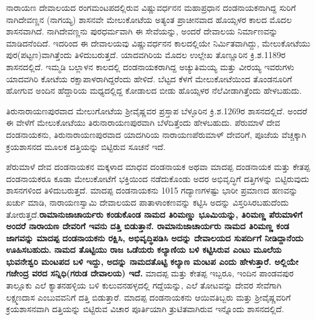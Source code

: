 \vskip 3pt

ನಾರಾಯಣ ದೇವಾಲಯದ ರಂಗಮಂಟಪದಲ್ಲಿರುವ ವಿಷ್ಣುವರ್ಧನನ ಮಹಾಪ್ರಧಾನ ದಂಡನಾಯಕನಾಗಿದ್ದ ಸುರಿಗೆ ನಾಗಿದೇವಣ್ಣನ (ನಾಗಯ್ಯ) ಶಾಸನವೇ ಮೇಲುಕೋಟೆಯ ಅತ್ಯಂತ ಪ್ರಾಚೀನವಾದ ಹೊಯ್ಸಳರ ಕಾಲದ ಮೊದಲ ಶಾಸನವಾಗಿದೆ. ನಾಗಿದೇವಣ್ಣನು ಪುರಧರ್ಮವಾಗಿ ಈ ಸೇವೆಯನ್ನು, ಅಂದರೆ ದೇವಾಲಯ ನಿರ್ಮಾಣವನ್ನು ಮಾಡಿದನೆಂದಿದೆ. ಇದರಿಂದ ಈ ದೇವಾಲಯವು ವಿಷ್ಣುವರ್ಧನನ ಕಾಲದಲ್ಲಿಯೇ ನಿರ್ಮಿತವಾಗಿದ್ದು, ಮೇಲುಕೋಟೆಯು ಪುರ(ಪಟ್ಟಣ)ವಾಗಿ\-ತ್ತೆಂದು ತಿಳಿದುಬರುತ್ತದೆ. ಯಾದವಗಿರಿಯ ಮೊದಲ ಉಲ್ಲೇಖ ತೊಣ್ಣೂರಿನ ಕ್ರಿ.ಶ.1189ರ ಶಾಸನದಲ್ಲಿದೆ. ಇಮ್ಮಡಿ ಬಲ್ಲಾಳನ ಕಾಲದಲ್ಲಿ ದಂಡನಾಯಕರಾಗಿದ್ದ ಅಚ್ಯುತಿಮಯ್ಯ ಮತ್ತು ವೀರಯ್ಯ ಇವರುಗಳು ಯಾದವಗಿರಿ ಕೋಟೆಯ ರಕ್ಷಾಪಾಳರಾಗಿದ್ದರೆಂದು ಹೇಳಿದೆ. ಬೆಟ್ಟದ ಕೆಳಗೆ ಮೇಲುಕೋಟೆಯಿಂದ ತೊಂಡನೂರಿಗೆ ಹೋಗುವ ಅಂದಿನ ಹೆದ್ದಾರಿಯ ಮಧ್ಯದಲ್ಲಿದ್ದ ಕೋಡಾಲದ ಬೀಡು ಹೊಯ್ಸಳರ ನೆಲೆವೀಡಾಗಿತ್ತೆಂದು ಹೇಳಬಹುದು.

\vskip 3pt

ತಿರುನಾರಾಯಣಪುರವಾದ ಮೇಲುಗೋಟೆಯ ಶ‍್ರೀವೈಷ್ಣವರ ಪ್ರಸ್ತಾಪ ಬೆಳ್ಳೂರಿನ ಕ್ರಿ.ಶ.1269ರ ಶಾಸನದಲ್ಲಿದೆ. ಅಂದರೆ ಈ ವೇಳೆಗೆ ಮೇಲುಕೋಟೆಯು ತಿರುನಾರಾಯಣಪುರವಾಗಿ ಬೆಳೆದಿತ್ತೆಂದು ಹೇಳಬಹುದು. ಪೆರುಮಾಳೆ ದೇವ ದಂಡನಾಯಕನು, ತಿರುನಾರಾಯಣಪುರವಾದ ಯಾದಗಿರಿಯ ನಾರಾಯಣಪೆರುಮಾಳ್​ ದೇವರಿಗೆ, ಪೂಜೆಯ ವೆಚ್ಚಕ್ಕಾಗಿ ಕ್ರಯಶಾಸನದ ಮೂಲಕ ದತ್ತಿಯನ್ನು ಬಿಟ್ಟಿರುವ ಸೂಚನೆ ಇದೆ.

\vskip 3pt

ಪೆರುಮಾಳೆ ದೇವ ದಂಡನಾಯಕನ ಮಕ್ಕಳಾದ ಮಾಧವ ದಂಡನಾಯಕ ಅಥವಾ ಮಾದಪ್ಪ ದಂಡನಾಯಕ ಮತ್ತು ಕೇತಪ್ಪ ದಂಡನಾಯಕರೂ ಕೂಡಾ ಮೇಲುಕೋಟೆಗೆ ಭಕ್ತಿಯಿಂದ ನಡೆದುಕೊಂಡು ಅದರ ಅಭಿವೃದ್ಧಿಗೆ ದತ್ತಿಗಳನ್ನು ಬಿಟ್ಟಿರುವುದು ಶಾಸನಗಳಿಂದ ತಿಳಿದುಬರುತ್ತದೆ. ಮಾದಪ್ಪ ದಂಡನಾಯಕನು 1015 ಗದ್ಯಾಣಗಳಷ್ಟು ಭಾರೀ ಪ್ರಮಾಣದ ಹಣವನ್ನು ಖರ್ಚು ಮಾಡಿ, ನಾರಾಯಣಸ್ವಾಮಿ ದೇವಾಲಯದ ಪಾತಾಳಾಂಕಣವನ್ನು ಕಟ್ಟಿಸಿ ಅದನ್ನು ವಿಸ್ತರಿಸಿರಬಹುದೆಂದು ತೋರುತ್ತದೆ.\textbf{ರಾಮಾನುಜಾಚಾರ್ಯರು ಕಂಡುಕೊಂಡ ನಾಮದ ತಿರಿಮಣ್ಣು ಭೂಮಿಯನ್ನು, ತಿರಿಮಣ್ಣ ಪೆರುಮಾಳಿಗೆ ಅಂದರೆ ನಾರಾಯಣ ದೇವರಿಗೆ ಇವನು ದತ್ತಿ ಬಿಡುತ್ತಾನೆ. ರಾಮಾನುಜಾಚಾರ್ಯರು ನಾಮದ ತಿರಿಮಣ್ಣ ಕಂಡ ಜಾಗವನ್ನು ಮಾದಪ್ಪ ದಂಡನಾಯಕನು ರಕ್ಷಿಸಿ, ಅಭಿವೃದ್ಧಿಪಡಿಸಿ ಅದನ್ನು ದೇವಾಲಯದ ಸುಪರ್ದಿಗೆ ನೀಡಿದ್ದಾನೆಂದು ಊಹಿಸಬಹುದು.} \textbf{ನಾಮದ ತೊಟ್ಟಿಯು ರಾಜ ಒಡೆಯರು ಕಲ್ಯಾಣಿಯ ಬಳಿ ಕಟ್ಟಿಸಿರುವ ಎಂಟು ಮೂಲೆಯ ಭುವನೇಶ್ವರಿ ಮಂಟಪದ ಬಳಿ ಇದ್ದು, ಅದನ್ನು ನಾಮದತೊಟ್ಟಿ ಕಲ್ಯಾಣ ಮಂಟಪ ಎಂದು ಹೇಳುತ್ತಾರೆ. ಅಲ್ಲಿಯೇ ಗಜೇಂದ್ರ ವರದ ಸನ್ನಿಧಿ(ಗರುಡ ದೇವಾಲಯ) ಇದೆ. } ಮಾದಪ್ಪ ಮತ್ತು ಕೇತಪ್ಪ ಇಬ್ಬರೂ, ಇಂದಿನ ಪಾಂಡವಪುರ ತಾಲ್ಲೂಕು ಎಲೆ ಕ್ಯಾತನಹಳ್ಳಿಯ ಬಳಿ ಕುಲುವನಹಳ್ಳದಲ್ಲಿ ಗದ್ದೆಯನ್ನು, ಎಲೆ ತೋಟವನ್ನು ದೇವರ ಸೇವೆಗಾಗಿ ಲಕ್ಷ್ಮಣದಾಸ ಎಂಬುವವನಿಗೆ ದತ್ತಿ ಬಿಡುತ್ತಾರೆ. ಮಾದಪ್ಪ ದಂಡನಾಯಕನು ಆಯಿವತಿಬ್ಬರು ಮತ್ತು ಶ‍್ರೀವೈಷ್ಣವರಿಗೆ ಕ್ರಯಶಾಸನವಾಗಿ ದತ್ತಿಯನ್ನು ಬಿಟ್ಟಿರುವ ವಿಚಾರ ಪೂರ್ತಿಯಾಗಿ ತ್ರುಟಿತವಾಗಿರುವ ಇನ್ನೊಂದು ಶಾಸನದಲ್ಲಿದೆ.

